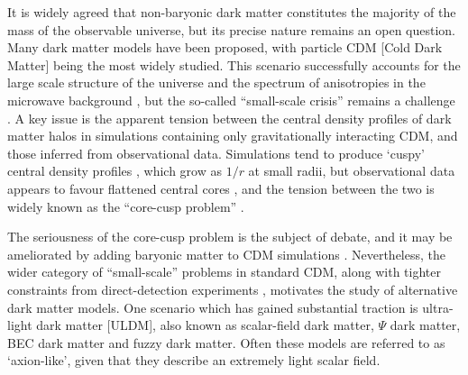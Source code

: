 \documentclass{pasa}%
\begin{document}
It is widely agreed that non-baryonic dark matter constitutes the majority of the mass of the observable universe, but its precise nature remains an open question. Many dark matter models have been proposed, with particle CDM [Cold Dark Matter]  being the most widely studied. This scenario successfully accounts for the large scale structure of the universe \cite{Springel:2005nw} and the spectrum of anisotropies in the microwave background \cite{deBernardis:2000sbo, Hanany:2000qf, Halverson:2001yy, Netterfield:2001yq, Lee:2001yp, Ade:2015xua,  Hu:2001bc}, but the so-called ``small-scale crisis''  remains a challenge \cite{Weinberg:2013aya}. A key issue is the apparent tension between the  central density profiles of dark matter halos in simulations containing only gravitationally interacting CDM, and those inferred from observational data. Simulations tend to produce `cuspy' central density profiles \cite{Navarro:1995iw}, which grow as $1/r$ at small radii, but observational data appears to favour flattened central cores \cite{Moore:1994yx}, and the tension between the two is widely known as the ``core-cusp problem'' \cite{Dutton:2018nop, Read:2018pft, Genina:2018}. 
 
The seriousness of the core-cusp problem is the subject of  debate, and it may be ameliorated by adding baryonic matter to CDM simulations \cite{Benitez-Llambay:2018}. Nevertheless, the wider category of  ``small-scale'' problems in standard CDM, along with tighter constraints from direct-detection experiments \cite{Schumann:2019eaa}, motivates the study of alternative dark matter models. One scenario which has gained substantial traction is ultra-light dark matter [ULDM], also known  as scalar-field dark matter, $\Psi$ dark matter, BEC dark matter and fuzzy dark matter. Often these models are referred to as `axion-like', given that they describe an extremely light scalar field. %
\end{document}

